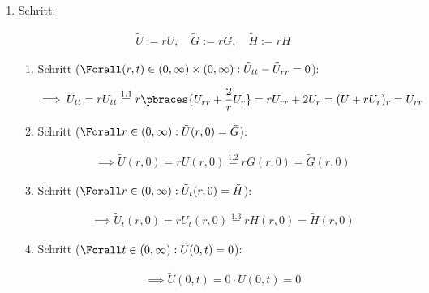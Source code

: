 \begin{solution}
\begin{enumerate}[label = \arabic*.]
\begin{enumerate}[label = 1.\arabic*.]
    \end{enumerate}

    \item Schritt:

    \begin{align*}
        \tilde U := r U,
        \quad
        \tilde G := r G,
        \quad
        \tilde H := r H
    \end{align*}

    \begin{enumerate}[label = 2.\arabic*.]

        \item Schritt ($\Forall (r, t) \in (0, \infty) \times (0, \infty): \tilde U_{tt} - \tilde U_{rr} = 0$):
        
        \begin{align*}
            \implies
            \tilde U_{tt}
            =
            r U_{tt}
            \stackrel
            {
                \mathrm{1.1}
            }{=}
            r \pbraces{U_{rr} + \frac{2}{r} U_r}
            =
            r U_{rr} + 2 U_r
            =
            (U + r U_r)_r
            =
            \tilde U_{rr}
        \end{align*}

        \item Schritt ($\Forall r \in (0, \infty): \tilde U(r, 0) = \tilde G$):
        
        \begin{align*}
            \implies
            \tilde U(r, 0)
            =
            r U(r, 0)
            \stackrel
            {
                \mathrm{1.2}
            }{=}
            r G(r, 0)
            =
            \tilde G(r, 0)
        \end{align*}

        \item Schritt ($\Forall r \in (0, \infty): \tilde U_t(r, 0) = \tilde H$):
        
        \begin{align*}
            \implies
            \tilde U_t(r, 0)
            =
            r U_t(r, 0)
            \stackrel
            {
                \mathrm{1.3}
            }{=}
            r H(r, 0)
            =
            \tilde H(r, 0)
        \end{align*}

        \item Schritt ($\Forall t \in (0, \infty): \tilde U(0, t) = 0$):
        
        \begin{align*}
            \implies
            \tilde U(0, t)
            =
            0 \cdot U(0, t)
            =
            0
        \end{align*}


\end{enumerate}
\end{enumerate}
\end{solution}
